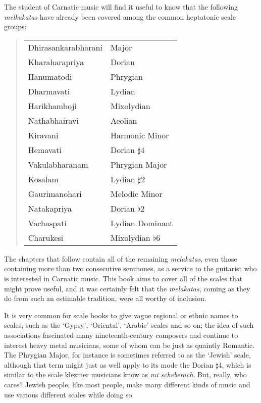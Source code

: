 \documentclass[english]{./gbook}
\begin{document}
\begin{large}
The student of Carnatic music will find it useful to know that the following \emph{melkakatas} have already been covered among the common heptatonic scale groups:
\begin{quote}
	\begin{tabular}{ll}
		Dhirasankarabharani	&	Major \\
		Kharaharapriya	&	Dorian \\
		Hanumatodi	&	Phrygian \\
		Dharmavati	&	Lydian \\
		Harikhamboji	&	Mixolydian \\
		Nathabhairavi	&	Aeolian \\
		Kiravani	&	Harmonic Minor \\
		Hemavati	&	Dorian $\sharp$4 \\
		Vakulabharanam	&	Phrygian Major \\
		Kosalam		&	Lydian $\sharp$2 \\
		Gaurimanohari	&	Melodic Minor \\
		Natakapriya	&	Dorian $\flat$2 \\
		Vachaspati	&	Lydian Dominant \\
		Charukesi	&	Mixolydian $\flat$6
	\end{tabular}
\end{quote}
The chapters that follow contain all of the remaining \emph{melakatas}, even those containing more than two consecutive semitones, as a service to the guitarist who is interested in Carnatic music. This book aims to cover all of the scales that might prove useful, and it was certainly felt that the \emph{melakatas}, coming as they do from such an estimable tradition, were all worthy of inclusion.

It is very common for scale books to give vague regional or ethnic names to scales, such as the `Gypsy', `Oriental', `Arabic' scales and so on; the idea of such associations fascinated many nineteenth-century composers and continue to interest heavy metal musicians, some of whom can be just as quaintly Romantic. The Phrygian Major, for instance is sometimes referred to as the `Jewish' scale, although that term might just as well apply to its mode the Dorian $\sharp$4, which is similar to the scale klezmer musicians know as \emph{mi scheberach}. But, really, who cares? Jewish people, like most people, make many different kinds of music and use various different scales while doing so.


\end{large}
\end{document}
